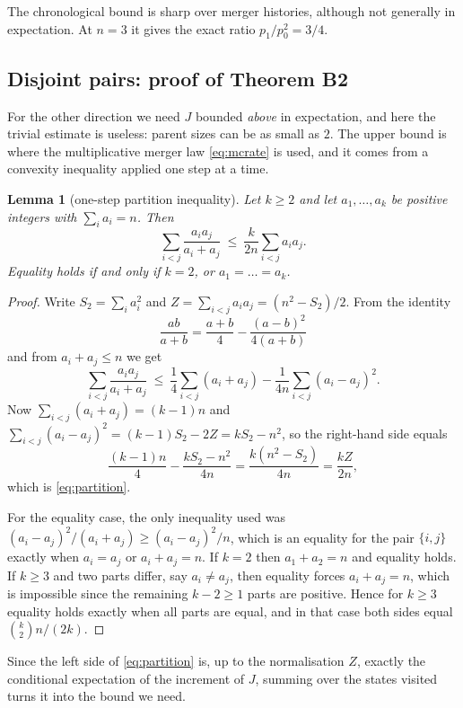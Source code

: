 \documentclass[10pt,a4paper]{amsart}
\newtheorem{lemma}[theorem]{Lemma}
\begin{document}
The chronological bound is sharp over merger histories, although not generally
in expectation. At $n=3$ it gives the exact ratio $p_1/p_0^2=3/4$.

\subsection{Disjoint pairs: proof of Theorem B2}

For the other direction we need $J$ bounded \emph{above} in expectation, and here
the trivial estimate is useless: parent sizes can be as small as $2$. The upper
bound is where the multiplicative merger law \eqref{eq:mcrate} is used, and it
comes from a convexity inequality applied one step at a time.

\begin{lemma}[one-step partition inequality]
\label{lem:partition}
Let $k\ge2$ and let $a_1,\dots,a_k$ be positive integers with $\sum_i a_i=n$.
Then
\begin{equation}
\label{eq:partition}
\sum_{i<j}\frac{a_ia_j}{a_i+a_j}\ \le\ \frac{k}{2n}\sum_{i<j}a_ia_j .
\end{equation}
Equality holds if and only if $k=2$, or $a_1=\dots=a_k$.
\end{lemma}

\begin{proof}
Write $S_2=\sum_ia_i^2$ and $Z=\sum_{i<j}a_ia_j=(n^2-S_2)/2$. From the identity
\[
\frac{ab}{a+b}=\frac{a+b}4-\frac{(a-b)^2}{4(a+b)}
\]
and from $a_i+a_j\le n$ we get
\[
\sum_{i<j}\frac{a_ia_j}{a_i+a_j}
\ \le\ \frac14\sum_{i<j}(a_i+a_j)-\frac1{4n}\sum_{i<j}(a_i-a_j)^2 .
\]
Now $\sum_{i<j}(a_i+a_j)=(k-1)n$ and
$\sum_{i<j}(a_i-a_j)^2=(k-1)S_2-2Z=kS_2-n^2$, so the right-hand side equals
\[
\frac{(k-1)n}{4}-\frac{kS_2-n^2}{4n}=\frac{k(n^2-S_2)}{4n}=\frac{kZ}{2n},
\]
which is \eqref{eq:partition}.

For the equality case, the only inequality used was
$(a_i-a_j)^2/(a_i+a_j)\ge(a_i-a_j)^2/n$, which is an equality for the pair
$\{i,j\}$ exactly when $a_i=a_j$ or $a_i+a_j=n$. If $k=2$ then $a_1+a_2=n$ and
equality holds. If $k\ge3$ and two parts differ, say $a_i\ne a_j$, then equality
forces $a_i+a_j=n$, which is impossible since the remaining $k-2\ge1$ parts are
positive. Hence for $k\ge3$ equality holds exactly when all parts are equal, and
in that case both sides equal $\binom k2 n/(2k)$.
\end{proof}

Since the left side of \eqref{eq:partition} is, up to the normalisation $Z$,
exactly the conditional expectation of the increment of $J$, summing over the
states visited turns it into the bound we need.
\end{document}
